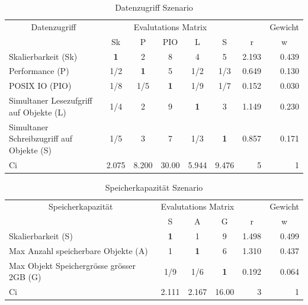 \begin{table}[htbp]
\caption{Datenzugriff Szenario}
\begin{tabular}{|p{4.5cm}|c|c|c|c|c|r|r|}
\hline
\multicolumn{ 1}{|c|}{Datenzugriff} & \multicolumn{ 5}{c|}{Evalutations Matrix} & \multicolumn{1}{l|}{} & \multicolumn{1}{l|}{Gewicht} \\ \cline{ 2- 8}
\multicolumn{ 1}{|c|}{} & Sk & P & PIO  & L & S & \multicolumn{1}{c|}{r} & \multicolumn{1}{c|}{w} \\ \hline
Skalierbarkeit (Sk) & \textbf{1} & 2 & 8 & 4 & 5 & 2.193 & 0.439 \\ \hline
Performance (P) &  1/2 & \textbf{1} & 5 &  1/2 &  1/3 & 0.649 & 0.130 \\ \hline
POSIX IO (PIO) &  1/8 &  1/5 & \textbf{1} &  1/9 &  1/7 & 0.152 & 0.030 \\ \hline
Simultaner Lesezufgriff 
auf Objekte (L) &  1/4 & 2 & 9 & \textbf{1} & 3 & 1.149 & 0.230 \\ \hline
Simultaner Schreibzugriff
 auf Objekte (S) &  1/5 & 3 & 7 &  1/3 & \textbf{1} & 0.857 & 0.171 \\ \hline \hline
Ci & \multicolumn{1}{r|}{2.075} & \multicolumn{1}{r|}{8.200} & \multicolumn{1}{r|}{30.00} & \multicolumn{1}{r|}{5.944} & \multicolumn{1}{r|}{9.476} & 5 & 1 \\ \hline
\end{tabular}
\label{AHPDatenzugriffS}
\end{table}

\begin{table}[htbp]
\caption{Speicherkapazität Szenario}
\begin{tabular}{|p{7.1cm}|c|c|c|r|r|}
\hline
\multicolumn{ 1}{|c|}{Speicherkapazität } & \multicolumn{ 3}{c|}{Evalutations Matrix} & \multicolumn{1}{l|}{} & \multicolumn{1}{l|}{Gewicht} \\ \cline{ 2- 6}
\multicolumn{ 1}{|c|}{} & S & A & G & \multicolumn{1}{c|}{r} & \multicolumn{1}{c|}{w} \\ \hline
Skalierbarkeit (S) & \textbf{1} & 1 & 9 & 1.498 & 0.499 \\ \hline
Max Anzahl speicherbare Objekte (A) & 1 & \textbf{1} & 6 & 1.310 & 0.437 \\ \hline
Max Objekt Speichergrösse grösser 2GB (G) &  1/9 &  1/6 & \textbf{1} & 0.192 & 0.064 \\ \hline \hline
Ci & \multicolumn{1}{r|}{2.111} & \multicolumn{1}{r|}{2.167} & \multicolumn{1}{r|}{16.00} & 3 & 1 \\ \hline
\end{tabular}
\label{AHPSpeicherkapazitätS}
\end{table}


